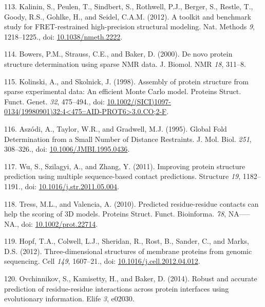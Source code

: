 \documentclass[11pt,a4paper,twoside]{book}
\theoremstyle{definition}
\theoremstyle{definition}
\theoremstyle{remark}
\begin{document}
\hypertarget{ref-Kalinin2012}{}
113. Kalinin, S., Peulen, T., Sindbert, S., Rothwell, P.J., Berger, S.,
Restle, T., Goody, R.S., Gohlke, H., and Seidel, C.A.M. (2012). A
toolkit and benchmark study for FRET-restrained high-precision
structural modeling. Nat. Methods \emph{9}, 1218--1225., doi:
\href{https://doi.org/10.1038/nmeth.2222}{10.1038/nmeth.2222}.

\hypertarget{ref-Bowers2000}{}
114. Bowers, P.M., Strauss, C.E., and Baker, D. (2000). De novo protein
structure determination using sparse NMR data. J. Biomol. NMR \emph{18},
311--8.

\hypertarget{ref-Kolinski1998}{}
115. Kolinski, A., and Skolnick, J. (1998). Assembly of protein
structure from sparse experimental data: An efficient Monte Carlo model.
Proteins Struct. Funct. Genet. \emph{32}, 475--494., doi:
\href{https://doi.org/10.1002/(SICI)1097-0134(19980901)32:4\%3C475::AID-PROT6\%3E3.0.CO;2-F}{10.1002/(SICI)1097-0134(19980901)32:4\textless{}475::AID-PROT6\textgreater{}3.0.CO;2-F}.

\hypertarget{ref-Aszodi1995a}{}
116. Aszódi, A., Taylor, W.R., and Gradwell, M.J. (1995). Global Fold
Determination from a Small Number of Distance Restraints. J. Mol. Biol.
\emph{251}, 308--326., doi:
\href{https://doi.org/10.1006/JMBI.1995.0436}{10.1006/JMBI.1995.0436}.

\hypertarget{ref-Wu2011}{}
117. Wu, S., Szilagyi, A., and Zhang, Y. (2011). Improving protein
structure prediction using multiple sequence-based contact predictions.
Structure \emph{19}, 1182--1191., doi:
\href{https://doi.org/10.1016/j.str.2011.05.004}{10.1016/j.str.2011.05.004}.

\hypertarget{ref-Tress2010}{}
118. Tress, M.L., and Valencia, A. (2010). Predicted residue-residue
contacts can help the scoring of 3D models. Proteins Struct. Funct.
Bioinforma. \emph{78}, NA-----NA., doi:
\href{https://doi.org/10.1002/prot.22714}{10.1002/prot.22714}.

\hypertarget{ref-Hopf2012}{}
119. Hopf, T.A., Colwell, L.J., Sheridan, R., Rost, B., Sander, C., and
Marks, D.S. (2012). Three-dimensional structures of membrane proteins
from genomic sequencing. Cell \emph{149}, 1607--21., doi:
\href{https://doi.org/10.1016/j.cell.2012.04.012}{10.1016/j.cell.2012.04.012}.

\hypertarget{ref-Ovchinnikov2014a}{}
120. Ovchinnikov, S., Kamisetty, H., and Baker, D. (2014). Robust and
accurate prediction of residue-residue interactions across protein
interfaces using evolutionary information. Elife \emph{3}, e02030.
\end{document}
